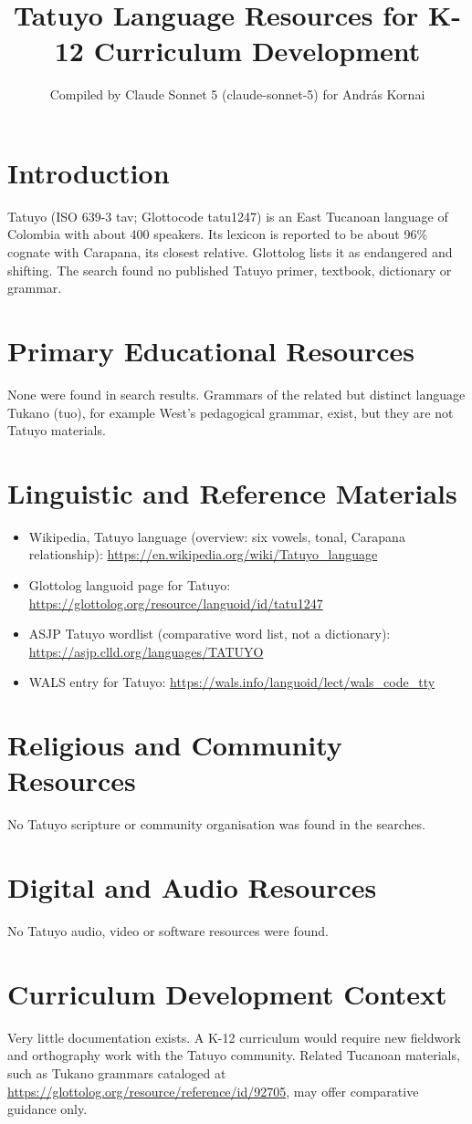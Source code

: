 \documentclass[12pt]{article}
\title{Tatuyo Language Resources for K-12 Curriculum Development}
\author{Compiled by Claude Sonnet 5 (claude-sonnet-5) for Andr\'as Kornai}
\date{}
\begin{document}
\maketitle
\section{Introduction}
Tatuyo (ISO 639-3 tav; Glottocode tatu1247) is an East Tucanoan language of Colombia with about 400 speakers. Its lexicon is reported to be about 96\% cognate with Carapana, its closest relative. Glottolog lists it as endangered and shifting. The search found no published Tatuyo primer, textbook, dictionary or grammar.
\section{Primary Educational Resources}
None were found in search results. Grammars of the related but distinct language Tukano (tuo), for example West's pedagogical grammar, exist, but they are not Tatuyo materials.
\section{Linguistic and Reference Materials}
\begin{itemize}
\item Wikipedia, Tatuyo language (overview: six vowels, tonal, Carapana relationship): \url{https://en.wikipedia.org/wiki/Tatuyo_language}
\item Glottolog languoid page for Tatuyo: \url{https://glottolog.org/resource/languoid/id/tatu1247}
\item ASJP Tatuyo wordlist (comparative word list, not a dictionary): \url{https://asjp.clld.org/languages/TATUYO}
\item WALS entry for Tatuyo: \url{https://wals.info/languoid/lect/wals_code_tty}
\end{itemize}
\section{Religious and Community Resources}
No Tatuyo scripture or community organisation was found in the searches.
\section{Digital and Audio Resources}
No Tatuyo audio, video or software resources were found.
\section{Curriculum Development Context}
Very little documentation exists. A K-12 curriculum would require new fieldwork and orthography work with the Tatuyo community. Related Tucanoan materials, such as Tukano grammars cataloged at \url{https://glottolog.org/resource/reference/id/92705}, may offer comparative guidance only.
\end{document}
